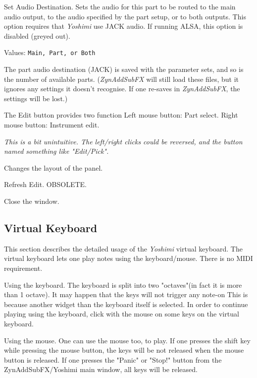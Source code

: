    Set Audio Destination.
   Sets the audio for this part to be routed to the main audio output, to
   the audio specified by the part setup, or to both outputs.
   This option requires that \textsl{Yoshimi} use JACK audio.  If running
   ALSA, this option is disabled (greyed out).

   Values: \texttt{Main, Part, or Both}

   The part audio destination (JACK) is saved with the parameter sets, and
   so is the number of available parts.  (\textsl{ZynAddSubFX} will still
   load these files, but it ignores any settings it doesn't recognise. If
   one re-saves in \textsl{ZynAddSubFX}, the settings will be lost.)

   The Edit button provides two function
   Left mouse button: Part select.
   Right mouse button: Instrument edit.

   \textsl{This is a bit unintuitive.  The left/right clicks could be
   reversed, and the button named something like "Edit/Pick".}

   Changes the layout of the panel.

   Refresh Edit. OBSOLETE.

   Close the window.

\subsection{Virtual Keyboard}
\label{subsec:virtual_keyboard}

   This section describes the detailed usage of the
   \textsl{Yoshimi} virtual keyboard.
   The virtual keyboard lets one play notes using the keyboard/mouse. There is
   no MIDI requirement. 
    
   Using the keyboard. The keyboard is split into two "octaves"(in fact it is
   more than 1 octave). It may happen that the keys will not trigger any
   note-on This is because another widget than the keyboard itself is selected.
   In order to continue playing using the keyboard, click with the mouse on
   some keys on the virtual keyboard.
   
   Using the mouse. One can use the mouse too, to play.
   If one presses the shift key while pressing the mouse button,
   the keys will be not released when the mouse button is released.  If one
   presses the "Panic" or "Stop!" button from the ZynAddSubFX/Yoshimi
   main window, all keys will be released. 

